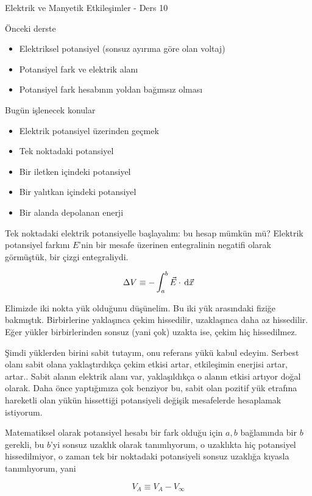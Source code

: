 \documentclass[12pt,fleqn]{article}\usepackage{../../common}
\begin{document}
Elektrik ve Manyetik Etkileşimler - Ders 10

Önceki derste

\begin{itemize}
   \item Elektriksel potansiyel (sonsuz ayırıma göre olan voltaj)
   \item Potansiyel fark ve elektrik alanı
   \item Potansiyel fark hesabının yoldan bağımsız olması
\end{itemize}

Bugün işlenecek konular

\begin{itemize}
   \item Elektrik potansiyel üzerinden geçmek
   \item Tek noktadaki potansiyel
   \item Bir iletken içindeki potansiyel
   \item Bir yalıtkan içindeki potansiyel
   \item Bir alanda depolanan enerji
\end{itemize}

Tek noktadaki elektrik potansiyelle başlayalım: bu hesap mümkün mü? Elektrik
potansiyel farkını $E$'nin bir mesafe üzerinen entegralinin negatifi olarak
görmüştük, bir çizgi entegraliydi.

$$
\Delta V \equiv -\int _{a}^{b} \vec{E} \cdot \,\mathrm{d} \vec{x}
$$

Elimizde iki nokta yük olduğunu düşünelim. Bu iki yük arasındaki fiziğe
bakmıştık. Birbirlerine yaklaşınca çekim hissedilir, uzaklaşınca daha az
hissedilir. Eğer yükler birbirlerinden sonsuz (yani çok) uzakta ise, çekim hiç
hissedilmez.

Şimdi yüklerden birini sabit tutayım, onu referans yükü kabul edeyim. Serbest
olanı sabit olana yaklaştırdıkça çekim etkisi artar, etkileşimin enerjisi artar,
artar.. Sabit alanın elektrik alanı var, yaklaşıldıkça o alanın etkisi artıyor
doğal olarak. Daha önce yaptığımıza çok benziyor bu, sabit olan pozitif yük
etrafına hareketli olan yükün hissettiği potansiyeli değişik mesafelerde
hesaplamak istiyorum.

Matematiksel olarak potansiyel hesabı bir fark olduğu için $a,b$ bağlamında bir
$b$ gerekli, bu $b$'yi sonsuz uzaklık olarak tanımlıyorum, o uzaklıkta hiç
potansiyel hissedilmiyor, o zaman tek bir noktadaki potansiyeli sonsuz uzaklığa
kıyasla tanımlıyorum, yani

$$
V_A \equiv V_A - V_\infty
$$
\end{document}
